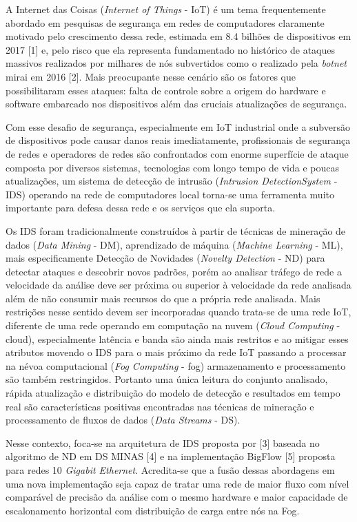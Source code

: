 A Internet das Coisas (\emph{Internet of Things} - IoT) é um tema frequentemente
abordado em pesquisas de segurança em redes de computadores claramente motivado
pelo crescimento dessa rede, estimada em 8.4 bilhões de dispositivos em 2017
[1] e, pelo risco que ela representa fundamentado no histórico de ataques
massivos realizados por milhares de nós subvertidos como o realizado pela \emph{botnet}
mirai em 2016 [2]. Mais preocupante nesse cenário são os fatores que
possibilitaram esses ataques: falta de controle sobre a origem do hardware e
software embarcado nos dispositivos além das cruciais atualizações de segurança.

Com esse desafio de segurança, especialmente em IoT industrial onde a subversão
de dispositivos pode causar danos reais imediatamente, profissionais de
segurança de redes e operadores de redes são confrontados com enorme superfície
de ataque composta por diversos sistemas, tecnologias com longo tempo de vida e
poucas atualizações, um sistema de detecção de intrusão (\emph{Intrusion DetectionSystem} - IDS)
operando na rede de computadores local torna-se uma ferramenta
muito importante para defesa dessa rede e os serviços que ela suporta.

Os IDS foram tradicionalmente construídos à partir de técnicas de mineração de
dados (\emph{Data Mining} - DM), aprendizado de máquina (\emph{Machine Learning} - ML), mais
especificamente Detecção de Novidades (\emph{Novelty Detection} - ND) para detectar
ataques e descobrir novos padrões, porém ao analisar tráfego de rede a
velocidade da análise deve ser próxima ou superior à velocidade da rede
analisada além de não consumir mais recursos do que a própria rede analisada.
Mais restrições nesse sentido devem ser incorporadas quando trata-se de uma rede
IoT, diferente de uma rede operando em computação na nuvem (\emph{Cloud Computing} - cloud),
especialmente latência e banda são ainda mais restritos e ao mitigar
esses atributos movendo o IDS para o mais próximo da
rede IoT passando a processar na névoa computacional (\emph{Fog Computing} - fog)
armazenamento e processamento são também restringidos. Portanto uma única
leitura do conjunto analisado, rápida atualização e distribuição do modelo de
detecção e resultados em tempo real são características positivas encontradas
nas técnicas de mineração e processamento de fluxos de dados (\emph{Data Streams} -
DS).

Nesse contexto, foca-se na arquitetura de IDS proposta por [3] baseada no
algoritmo de ND em DS MINAS [4] e na implementação BigFlow [5] proposta para
redes 10 \emph{Gigabit Ethernet}. Acredita-se que a fusão dessas abordagens em uma nova
implementação seja capaz de tratar uma rede de maior fluxo com nível comparável
de precisão da análise com o mesmo hardware e maior capacidade de escalonamento
horizontal com distribuição de carga entre nós na Fog.

